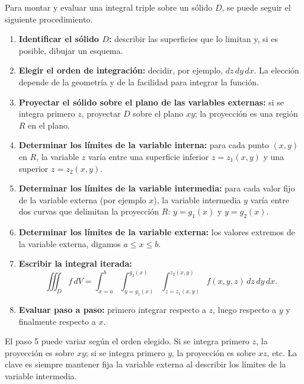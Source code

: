 \begin{pasos} Para montar y evaluar una integral triple sobre un sólido \(D\), se puede seguir el siguiente procedimiento.
\begin{enumerate}
    \item \textbf{Identificar el sólido \(D\):} describir las superficies que lo limitan y, si es posible, dibujar un esquema.
    \item \textbf{Elegir el orden de integración:} decidir, por ejemplo, \(dz\,dy\,dx\). La elección depende de la geometría y de la facilidad para integrar la función.
    \item \textbf{Proyectar el sólido sobre el plano de las variables externas:} si se integra primero \(z\), proyectar \(D\) sobre el plano \(xy\); la proyección es una región \(R\) en el plano.
    \item \textbf{Determinar los límites de la variable interna:} para cada punto \((x,y)\) en \(R\), la variable \(z\) varía entre una superficie inferior \(z = z_1(x,y)\) y una superior \(z = z_2(x,y)\).
    \item \textbf{Determinar los límites de la variable intermedia:} para cada valor fijo de la variable externa (por ejemplo \(x\)), la variable intermedia \(y\) varía entre dos curvas que delimitan la proyección \(R\): \(y = g_1(x)\) y \(y = g_2(x)\).
    \item \textbf{Determinar los límites de la variable externa:} los valores extremos de la variable externa, digamos \(a \le x \le b\).
    \item \textbf{Escribir la integral iterada:}
    \[
    \iiint_D f\,dV =
    \int_{x=a}^{b}
    \int_{y=g_1(x)}^{g_2(x)}
    \int_{z=z_1(x,y)}^{z_2(x,y)}
    f(x,y,z)\,dz\,dy\,dx.
    \]
    \item \textbf{Evaluar paso a paso:} primero integrar respecto a \(z\), luego respecto a \(y\) y finalmente respecto a \(x\).
\end{enumerate}
\end{pasos}

\begin{rem}
El paso 5 puede variar según el orden elegido. Si se integra primero \(z\), la proyección es sobre \(xy\); si se integra primero \(y\), la proyección es sobre \(xz\), etc. La clave es siempre mantener fija la variable externa al describir los límites de la variable intermedia.
\end{rem}


